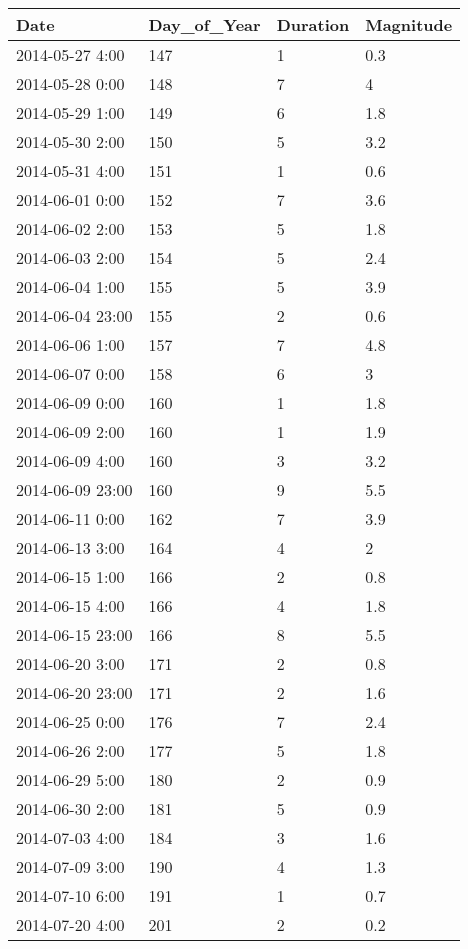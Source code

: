 \documentclass[
]{article}
\begin{document}
\begin{tabular}{l|l|l|l}
\hline
Date & Day\_of\_Year & Duration & Magnitude\\
\hline
2014-05-27 4:00 & 147 & 1 & 0.3\\
\hline
2014-05-28 0:00 & 148 & 7 & 4\\
\hline
2014-05-29 1:00 & 149 & 6 & 1.8\\
\hline
2014-05-30 2:00 & 150 & 5 & 3.2\\
\hline
2014-05-31 4:00 & 151 & 1 & 0.6\\
\hline
2014-06-01 0:00 & 152 & 7 & 3.6\\
\hline
2014-06-02 2:00 & 153 & 5 & 1.8\\
\hline
2014-06-03 2:00 & 154 & 5 & 2.4\\
\hline
2014-06-04 1:00 & 155 & 5 & 3.9\\
\hline
2014-06-04 23:00 & 155 & 2 & 0.6\\
\hline
2014-06-06 1:00 & 157 & 7 & 4.8\\
\hline
2014-06-07 0:00 & 158 & 6 & 3\\
\hline
2014-06-09 0:00 & 160 & 1 & 1.8\\
\hline
2014-06-09 2:00 & 160 & 1 & 1.9\\
\hline
2014-06-09 4:00 & 160 & 3 & 3.2\\
\hline
2014-06-09 23:00 & 160 & 9 & 5.5\\
\hline
2014-06-11 0:00 & 162 & 7 & 3.9\\
\hline
2014-06-13 3:00 & 164 & 4 & 2\\
\hline
2014-06-15 1:00 & 166 & 2 & 0.8\\
\hline
2014-06-15 4:00 & 166 & 4 & 1.8\\
\hline
2014-06-15 23:00 & 166 & 8 & 5.5\\
\hline
2014-06-20 3:00 & 171 & 2 & 0.8\\
\hline
2014-06-20 23:00 & 171 & 2 & 1.6\\
\hline
2014-06-25 0:00 & 176 & 7 & 2.4\\
\hline
2014-06-26 2:00 & 177 & 5 & 1.8\\
\hline
2014-06-29 5:00 & 180 & 2 & 0.9\\
\hline
2014-06-30 2:00 & 181 & 5 & 0.9\\
\hline
2014-07-03 4:00 & 184 & 3 & 1.6\\
\hline
2014-07-09 3:00 & 190 & 4 & 1.3\\
\hline
2014-07-10 6:00 & 191 & 1 & 0.7\\
\hline
2014-07-20 4:00 & 201 & 2 & 0.2\\

\end{tabular}
\end{document}

